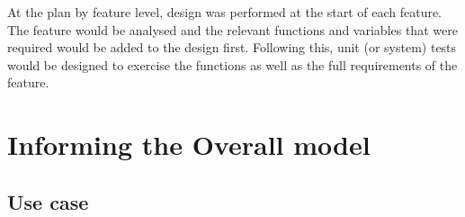 At the plan by feature level, design was performed at the start of each feature. The feature would be analysed and the relevant functions and variables that were required would be added to the design first. Following this, unit (or system) tests would be designed to exercise the functions as well as the full requirements of the feature.


\section{Informing the Overall model}
\subsection{Use case}
\begin{figure}[h!]
\end{figure}
